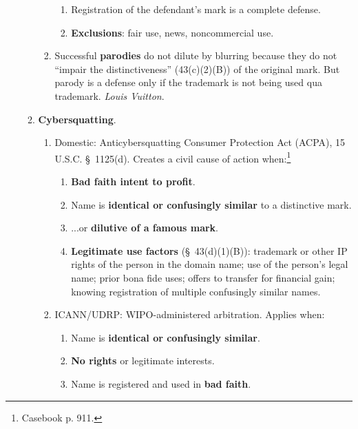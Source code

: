 \begin{enumerate}
\begin{enumerate}
\begin{enumerate}
\begin{enumerate}
                \item Registration of the defendant's mark is a complete 
                defense.
                \item \textbf{Exclusions}: fair use, news, noncommercial use.  
            \end{enumerate}
            \item Successful \textbf{parodies} do not dilute by blurring 
            because they do not ``impair the distinctiveness'' (43(c)(2)(B)) 
            of the original mark. But parody is a defense only if the 
            trademark is not being used qua trademark. \emph{Louis Vuitton}.
        \end{enumerate}
        \item \textbf{Cybersquatting}.
            \begin{enumerate}
                \item Domestic: Anticybersquatting Consumer Protection Act 
                (ACPA), 15 U.S.C. \S\ 1125(d). Creates a civil cause of action 
                when:\footnote{Casebook p. 911.}
                \begin{enumerate}
                    \item \textbf{Bad faith intent to profit}.
                    \item Name is \textbf{identical or confusingly similar} to 
                    a distinctive mark.
                    \item ...or \textbf{dilutive of a famous mark}.
                    \item \textbf{Legitimate use factors} (\S\ 43(d)(1)(B)): 
                    trademark or other IP rights of the person in the domain 
                    name; use of the person's legal name; prior bona fide 
                    uses; offers to transfer for financial gain; knowing 
                    registration of multiple confusingly similar names.
                \end{enumerate}
                \item ICANN/UDRP: WIPO-administered arbitration. Applies when:
                \begin{enumerate}
                    \item Name is \textbf{identical or confusingly similar}.
                    \item \textbf{No rights} or legitimate interests.
                    \item Name is registered and used in \textbf{bad faith}.
                \end{enumerate}

\end{enumerate}
\end{enumerate}
\end{enumerate}

